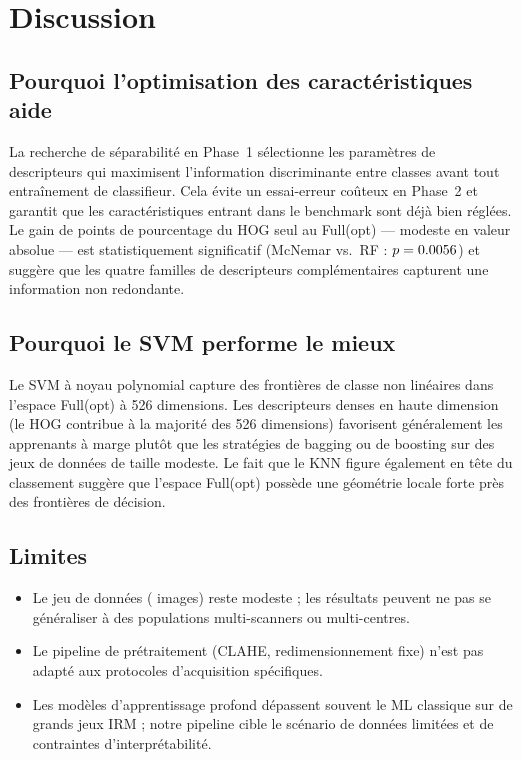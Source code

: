 \section{Discussion}
\label{sec:discussion}

\subsection{Pourquoi l'optimisation des caractéristiques aide}

La recherche de séparabilité en Phase~1 sélectionne les paramètres de descripteurs
qui maximisent l'information discriminante entre classes avant tout entraînement
de classifieur. Cela évite un essai-erreur coûteux en Phase~2 et garantit que
les caractéristiques entrant dans le benchmark sont déjà bien réglées. Le gain de
\FusionGain{} points de pourcentage du HOG seul au Full(opt) --- modeste en valeur
absolue --- est statistiquement significatif (McNemar vs.\ RF : $p = 0.0056$)
et suggère que les quatre familles de descripteurs complémentaires capturent une
information non redondante.

\subsection{Pourquoi le SVM performe le mieux}

Le SVM à noyau polynomial capture des frontières de classe non linéaires dans
l'espace Full(opt) à 526 dimensions. Les descripteurs denses en haute dimension
(le HOG contribue à la majorité des 526 dimensions) favorisent généralement les
apprenants à marge plutôt que les stratégies de bagging ou de boosting sur des
jeux de données de taille modeste. Le fait que le KNN figure également en tête
du classement suggère que l'espace Full(opt) possède une géométrie locale forte
près des frontières de décision.

\subsection{Limites}

\begin{itemize}
  \item Le jeu de données (\NTotal{} images) reste modeste ; les résultats peuvent
        ne pas se généraliser à des populations multi-scanners ou multi-centres.
  \item Le pipeline de prétraitement (CLAHE, redimensionnement fixe) n'est pas adapté
        aux protocoles d'acquisition spécifiques.
  \item Les modèles d'apprentissage profond dépassent souvent le ML classique sur
        de grands jeux IRM ; notre pipeline cible le scénario de données limitées
        et de contraintes d'interprétabilité.
\end{itemize}

